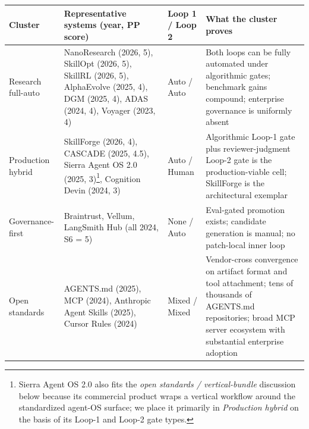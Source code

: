 \documentclass[
]{article}
\newcounter{none} %
\begin{document}
{\def\LTcaptype{none} %
\begin{longtable}[]{@{}
  >{\raggedright\arraybackslash}p{}
  >{\raggedright\arraybackslash}p{}
  >{\raggedright\arraybackslash}p{}
  >{\raggedright\arraybackslash}p{}@{}}
\toprule\noalign{}
\begin{minipage}[b]{\linewidth}\raggedright
Cluster
\end{minipage} & \begin{minipage}[b]{\linewidth}\raggedright
Representative systems (year, PP score)
\end{minipage} & \begin{minipage}[b]{\linewidth}\raggedright
Loop 1 / Loop 2
\end{minipage} & \begin{minipage}[b]{\linewidth}\raggedright
What the cluster proves
\end{minipage} \\
\midrule\noalign{}
\endhead
\bottomrule\noalign{}
\endlastfoot
Research full-auto & NanoResearch (2026, 5), SkillOpt (2026, 5), SkillRL
(2026, 5), AlphaEvolve (2025, 4), DGM (2025, 4), ADAS (2024, 4), Voyager
(2023, 4) & Auto / Auto & Both loops can be fully automated under
algorithmic gates; benchmark gains compound; enterprise governance is
uniformly absent \\
Production hybrid & SkillForge (2026, 4), CASCADE (2025, 4.5), Sierra
Agent OS 2.0 (2025, 3)\footnote{Sierra Agent OS 2.0 also fits the
  \emph{open standards / vertical-bundle} discussion below because its
  commercial product wraps a vertical workflow around the standardized
  agent-OS surface; we place it primarily in \emph{Production hybrid} on
  the basis of its Loop-1 and Loop-2 gate types.}, Cognition Devin
(2024, 3) & Auto / Human & Algorithmic Loop-1 gate plus
reviewer-judgment Loop-2 gate is the production-viable cell; SkillForge
is the architectural exemplar \\
Governance-first & Braintrust, Vellum, LangSmith Hub (all 2024, S6 = 5)
& None / Auto & Eval-gated promotion exists; candidate generation is
manual; no patch-local inner loop \\
Open standards & AGENTS.md (2025), MCP (2024), Anthropic Agent Skills
(2025), Cursor Rules (2024) & Mixed / Mixed & Vendor-cross convergence
on artifact format and tool attachment; tens of thousands of AGENTS.md
repositories; broad MCP server ecosystem with substantial enterprise
adoption \\
\end{longtable}
}
\end{document}

